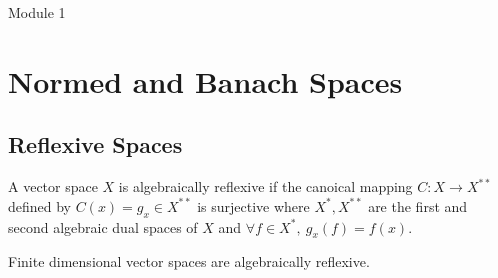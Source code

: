 
\setcounter{section}{3}
{\Large Module 1}
\section{Normed and Banach Spaces}
\setcounter{subsection}{5}
\subsection{Reflexive Spaces}
\begin{commentary}
\begin{description}
	\item[Algebraically Reflexive]
		A vector space $X$ is algebraically reflexive if the canoical mapping $C : X \to X^{\ast\ast}$ defined by $C(x) = g_x \in X^{\ast\ast}$ is surjective where $X^\ast, X^{\ast\ast}$ are the first and second algebraic dual spaces of $X$ and $\forall f \in X^\ast,\ g_x(f) = f(x)$.\cite[\S2.8]{Kreyszig}\\

	\item Finite dimensional vector spaces are algebraically reflexive.\cite[\S2.9.3]{Kreyszig}
\end{description}
\end{commentary}

